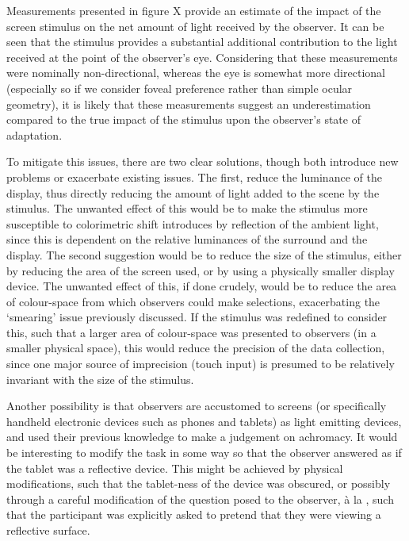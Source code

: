 Measurements presented in figure X provide an estimate of the impact of the screen stimulus on the net amount of light received by the observer. It can be seen that the stimulus provides a substantial additional contribution to the light received at the point of the observer's eye. Considering that these measurements were nominally non-directional, whereas the eye is somewhat more directional (especially so if we consider foveal preference rather than simple ocular geometry), it is likely that these measurements suggest an underestimation compared to the true impact of the stimulus upon the observer's state of adaptation.


To mitigate this issues, there are two clear solutions, though both introduce new problems or exacerbate existing issues. The first, reduce the luminance of the display, thus directly reducing the amount of light added to the scene by the stimulus. The unwanted effect of this would be to make the stimulus more susceptible to colorimetric shift introduces by reflection of the ambient light, since this is dependent on the relative luminances of the surround and the display. The second suggestion would be to reduce the size of the stimulus, either by reducing the area of the screen used, or by using a physically smaller display device. The unwanted effect of this, if done crudely, would be to reduce the area of colour-space from which observers could make selections, exacerbating the `smearing' issue previously discussed. If the stimulus was redefined to consider this, such that a larger area of colour-space was presented to observers (in a smaller physical space), this would reduce the precision of the data collection, since one major source of imprecision (touch input) is presumed to be relatively invariant with the size of the stimulus.

Another possibility is that observers are accustomed to screens (or specifically handheld electronic devices such as phones and tablets) as light emitting devices, and used their previous knowledge to make a judgement on achromacy. It would be interesting to modify the task in some way so that the observer answered as if the tablet was a reflective device. This might be achieved by physical modifications, such that the tablet-ness of the device was obscured, or possibly through a careful modification of the question posed to the observer, à la \citet{arend_simultaneous_1986}, such that the participant was explicitly asked to pretend that they were viewing a reflective surface.


